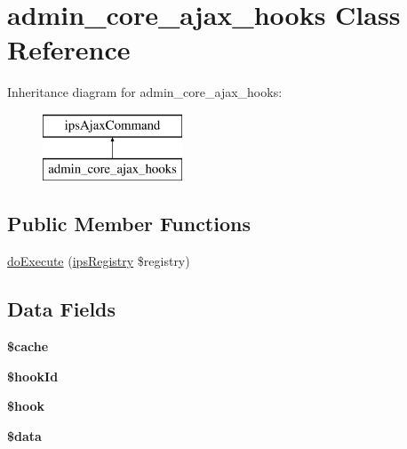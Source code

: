 \hypertarget{classadmin__core__ajax__hooks}{\section{admin\-\_\-core\-\_\-ajax\-\_\-hooks Class Reference}
\label{classadmin__core__ajax__hooks}
}
Inheritance diagram for admin\-\_\-core\-\_\-ajax\-\_\-hooks\-:\begin{figure}[H]
\begin{center}
\leavevmode
\includegraphics[height=2.000000cm]{classadmin__core__ajax__hooks}
\end{center}
\end{figure}
\subsection*{Public Member Functions}
\begin{DoxyCompactItemize}
\item 
\hyperlink{classadmin__core__ajax__hooks_afbc4e912a0604b94d47d66744c64d8ba}{do\-Execute} (\hyperlink{classips_registry}{ips\-Registry} \$registry)
\end{DoxyCompactItemize}
\subsection*{Data Fields}
\begin{DoxyCompactItemize}
\item 
\hypertarget{classadmin__core__ajax__hooks_ac2dc76d756ec398393d4b1d23659276c}{{\bfseries \$cache}}\label{classadmin__core__ajax__hooks_ac2dc76d756ec398393d4b1d23659276c}

\item 
\hypertarget{classadmin__core__ajax__hooks_a10fb002394024a151e4b037f8dc29730}{{\bfseries \$hook\-Id}}\label{classadmin__core__ajax__hooks_a10fb002394024a151e4b037f8dc29730}

\item 
\hypertarget{classadmin__core__ajax__hooks_aa8bb66649f6110e0f711a4af2b2d1bc8}{{\bfseries \$hook}}\label{classadmin__core__ajax__hooks_aa8bb66649f6110e0f711a4af2b2d1bc8}

\item 
\hypertarget{classadmin__core__ajax__hooks_a6efc15b5a2314dd4b5aaa556a375c6d6}{{\bfseries \$data}}\label{classadmin__core__ajax__hooks_a6efc15b5a2314dd4b5aaa556a375c6d6}

\end{DoxyCompactItemize}

